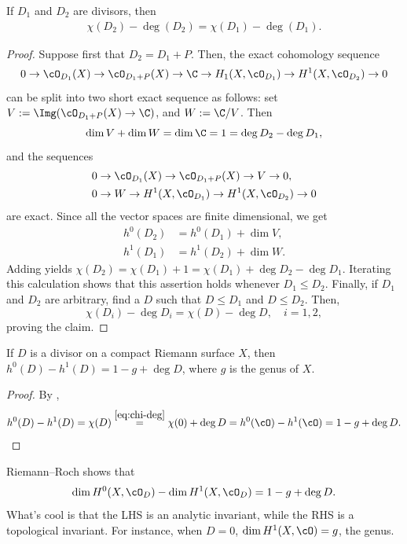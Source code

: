 \documentclass[11pt]{report}
\begin{document}
\begin{lem}[][label=lem:chi-deg]
If $D_1$ and $D_2$ are divisors, then
\begin{align} \label{eq:chi-deg}
    \chi(D_2)-\deg(D_2)=\chi(D_1)-\deg(D_1). 
\end{align}
\end{lem}

\begin{proof}
    Suppose first that $D_2 = D_1 + P$. Then, the exact cohomology sequence
    \[
    0 \to \cO_{D_1}(X) \to \cO_{D_1 + P}(X) \to \C \to H_1(X, \cO_{D_1}) \to H^1(X, \cO_{D_2}) \to 0
    \]
    can be split into two short exact sequence as follows: set $V := \Img (\cO_{D_1 +P}(X) \to \C)$, and $W:= \C /V$. Then $$\dim V + \dim W = \dim \C = 1 = \deg D_2 - \deg D_1,$$ and the sequences
    \begin{align*}
        &0 \to \cO_{D_1}(X) \to \cO_{D_1 +P}(X) \to V \to 0, \\ &0 \to W \to H^1(X,\cO_{D_1}) \to H^1(X,\cO_{D_2}) \to 0
    \end{align*}
    are exact. Since all the vector spaces are finite dimensional, we get 
    \begin{align*}
        h^0(D_2) &= h^0(D_1)+ \dim V, \\
        h^1 ( D_1) &= h^1(D_2)+ \dim W.
    \end{align*}
    Adding yields $\chi (D_2)=\chi(D_1)+1=\chi(D_1)+\deg D_2 - \deg D_1.$ Iterating this calculation shows that this assertion holds whenever $D_1 \leq D_2$. Finally, if $D_1$ and $D_2$ are arbitrary, find a $D$ such that $D \leq D_1$ and $D \leq D_2$. Then,
    \[
    \chi(D_i)-\deg D_i = \chi(D)-\deg D, \quad i =1,2,
    \]
    proving the claim.
\end{proof}

\begin{thm}
If $D$ is a divisor on a compact Riemann surface $X$, then $h^0(D) - h^1(D)=1-g+ \deg D$, where $g$ is the genus of $X$.
\end{thm}

\begin{proof}
By ,
\[
h^0(D)-h^1(D)=\chi(D)\overset{\eqref{eq:chi-deg}}{=} \chi(0)+\deg D = h^0(\cO)-h^1(\cO) = 1-g+\deg D.
\]
\end{proof}

\begin{rmk}
Riemann--Roch shows that
\[
\dim H^0(X,\cO_D) - \dim H^1(X, \cO_D) = 1-g + \deg D.
\]
What's cool is that the LHS is an analytic invariant, while the RHS is a topological invariant. For instance, when $D=0$, $\dim H^1(X,\cO)=g$, the genus.
\end{rmk}
\end{document}
